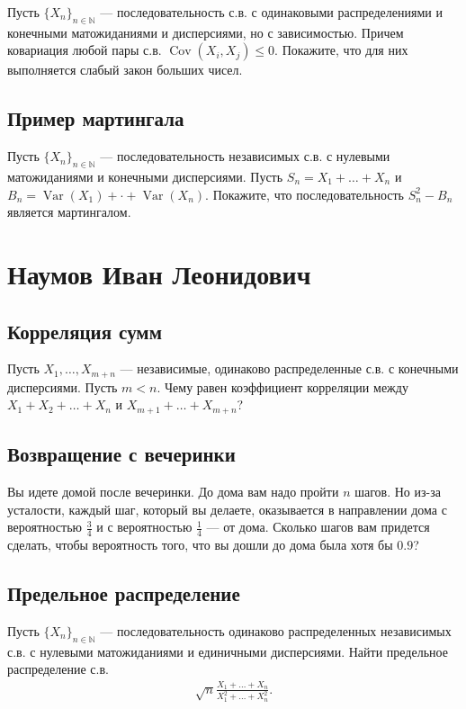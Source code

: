 \documentclass[12pt]{article}
\newcommand\N{\mathbb{N}}
\DeclareMathOperator{\Var}{Var}
\DeclareMathOperator{\Cov}{Cov}
\begin{document}
Пусть $\{X_n\}_{n \in \N}$ --- последовательность с.в. с одинаковыми распределениями и конечными матожиданиями и дисперсиями, но с зависимостью. Причем ковариация любой пары с.в. $\Cov(X_i, X_j) \le 0$. Покажите, что для них выполняется слабый закон больших чисел.


\subsection{Пример мартингала}

Пусть $\{X_n\}_{n \in \N}$ --- последовательность независимых с.в. с нулевыми матожиданиями и конечными дисперсиями. Пусть $S_n = X_1 + \dots + X_n$ и $B_n = \Var(X_1) + \cdot + \Var(X_n)$. Покажите, что последовательность $S_n^2 - B_n$ является мартингалом.


\newpage
\section{Наумов Иван Леонидович}

\subsection{Корреляция сумм}

Пусть $X_1, \dots, X_{m + n}$ --- независимые, одинаково распределенные с.в. с конечными дисперсиями. Пусть $m < n$. Чему равен коэффициент корреляции между $X_1 + X_2 + \dots + X_n$ и $X_{m + 1} + \dots + X_{m + n}$?

\subsection{Возвращение с вечеринки}

Вы идете домой после вечеринки. До дома вам надо пройти $n$ шагов. Но из-за усталости, каждый шаг, который вы делаете, оказывается в направлении дома с вероятностью $\frac{3}{4}$ и с вероятностью $\frac{1}{4}$ --- от дома. Сколько шагов вам придется сделать, чтобы вероятность того, что вы дошли до дома была хотя бы $0.9$?

\subsection{Предельное распределение}

Пусть $\{X_n\}_{n \in \N}$ --- последовательность одинаково распределенных независимых с.в. с нулевыми матожиданиями и единичными дисперсиями. Найти предельное распределение с.в.
\begin{align*}
    \sqrt{n}\frac{X_1 + \dots + X_n}{X_1^2 + \dots + X_n^2}.
\end{align*}
\end{document}
